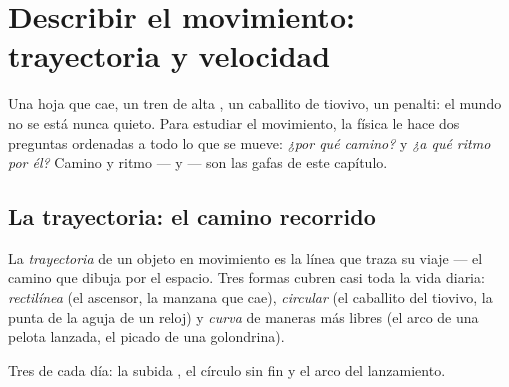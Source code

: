 \chapter{Describir el movimiento: trayectoria y velocidad}\label{ch:g6:describing-motion}

Una hoja que cae, un tren de alta , un caballito de tiovivo,
un penalti: el mundo no se está nunca quieto. Para estudiar el
movimiento, la física le hace dos preguntas ordenadas a todo lo que se
mueve: \emph{¿por qué camino?} y \emph{¿a qué ritmo por él?} Camino y
ritmo ---  y  --- son las gafas de este
capítulo.

\section{La trayectoria: el camino recorrido}

\begin{definition}[La trayectoria]\label{def:g6:describing-motion:trajectory}
La \emph{trayectoria} de un objeto en movimiento es
la línea que traza su viaje --- el camino que dibuja por el espacio.
Tres formas cubren casi toda la vida diaria:
\emph{rectilínea} (el ascensor, la
manzana que cae), \emph{circular} (el
caballito del tiovivo, la punta de la aguja de un reloj) y
\emph{curva} de maneras más libres (el arco de una pelota lanzada, el
picado de una golondrina).
\end{definition}

\begin{omfigure}

{\small Tres  de cada día: la subida , el
círculo sin fin y el arco del lanzamiento.}
\end{omfigure}

